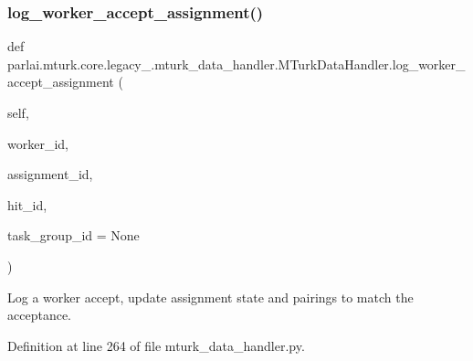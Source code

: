 \subsubsection{\texorpdfstring{log\+\_\+worker\+\_\+accept\+\_\+assignment()}{log\_worker\_accept\_assignment()}}
{\footnotesize\ttfamily def parlai.\+mturk.\+core.\+legacy\+\_.\+mturk\+\_\+data\+\_\+handler.\+M\+Turk\+Data\+Handler.\+log\+\_\+worker\+\_\+accept\+\_\+assignment (\begin{DoxyParamCaption}\item[{}]{self,  }\item[{}]{worker\+\_\+id,  }\item[{}]{assignment\+\_\+id,  }\item[{}]{hit\+\_\+id,  }\item[{}]{task\+\_\+group\+\_\+id = {\ttfamily None} }\end{DoxyParamCaption})}

\begin{DoxyVerb}Log a worker accept, update assignment state and pairings to match the
acceptance.
\end{DoxyVerb}
 

Definition at line 264 of file mturk\+\_\+data\+\_\+handler.\+py.


